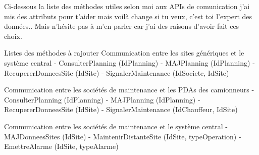 Ci-dessous la liste des méthodes utiles selon moi aux APIs de comunication
j'ai mis des attributs pour t'aider mais voilà change si tu veux, c'est toi l'expert des données..
Mais n'hésite pas à m'en parler car j'ai des raisons d'avoir fait ces choix.

Listes des méthodes à rajouter
Communication entre les sites génériques et le système central
    - ConsulterPlanning (IdPlanning)
    - MAJPlanning (IdPlanning)
    - RecupererDonneesSite (IdSite)
    - SignalerMaintenance (IdSociete, IdSite)

Communication entre les sociétés de maintenance et les PDAs des camionneurs
    - ConsulterPlanning (IdPlanning)
    - MAJPlanning (IdPlanning)
    - RecupererDonneesSite (IdSite)
    - SignalerMaintenance (IdChauffeur, IdSite)

Communication entre les sociétés de maintenance et le système central
    - MAJDonneesSites (IdSite)
    - MaintenirDistanteSite (IdSite, typeOperation)
    - EmettreAlarme (IdSite, typeAlarme)

